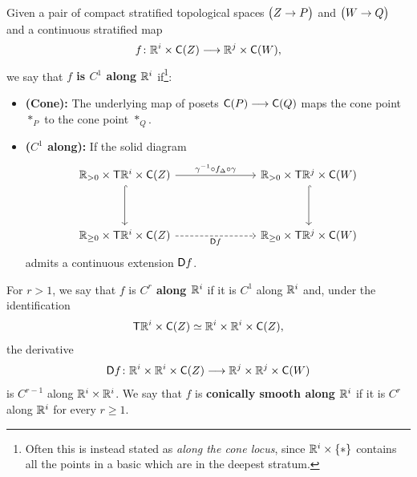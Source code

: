 \begin{definition}\cite[Definition 3.1.4]{AFT1}
    \label{ch4:: def: conically smooth along}
    Given a pair of compact stratified topological spaces $\big(Z\rightarrow P\big)$ and $\big(W\rightarrow Q\big)$ and a continuous stratified map 
    \begin{equation}
        f \colon \mathbb R^{i} \times \mathsf C(Z) \longrightarrow \mathbb R^{j} \times \mathsf C(W),
    \end{equation} 
    we say that \textbf{$f$ is $C^1$ along $\mathbb R^{i}$} if\footnote{Often this is instead stated as \emph{along the cone locus}, since $\mathbb R^{i}\times \{*\}$ contains all the points in a basic which are in the deepest stratum.}:
    \begin{itemize}
        \item \textbf{(Cone):} The underlying map of posets $\mathsf C(P) \longrightarrow \mathsf C(Q)$ maps the cone point $*_P$ to the cone point $*_Q$.
        \item \textbf{($C^1$ along):} If the solid diagram 
        \begin{equation}
            \begin{tikzcd}
                {\RR_{>0}\times \sT\RR^{i}\times \sC(Z)} &&& {\RR_{>0}\times \sT\RR^{j}\times \sC(W)} \\
                \\
                {\RR_{\geq 0}\times \sT\RR^{i}\times \sC(Z)} &&& {\RR_{\geq 0}\times \sT\RR^{j}\times \sC(W)}
                \arrow["{\gamma^{-1}\circ f_{\Delta}\circ \gamma}", from=1-1, to=1-4]
                \arrow[hook, from=1-1, to=3-1]
                \arrow[hook, from=1-4, to=3-4]
                \arrow["{\sD f}"', dashed, from=3-1, to=3-4]
            \end{tikzcd}
        \end{equation}
        admits a continuous extension $\mathsf D f$.  
    \end{itemize}
    For $r>1$, we say that $f$ is \textbf{$C^{r}$ along $\mathbb R^{i}$} if it is $C^1$ along $\mathbb R^{i}$ and, under the identification
    \begin{equation}
        \mathsf T\mathbb R^{i}\times \mathsf C(Z) \simeq \mathbb R^{i}\times \mathbb R^{i}\times \mathsf C(Z),
    \end{equation}
    the derivative
    \begin{equation}
        \mathsf D f \colon \mathbb R^{i}\times \mathbb R^{i}\times \mathsf C(Z) \longrightarrow \mathbb R^{j}\times \mathbb R^{j}\times \mathsf C(W)
    \end{equation}
    is $C^{r-1}$ along $\mathbb R^{i}\times \mathbb R^{i}$. We say that $f$ is \textbf{conically smooth along $\mathbb R^i$} if it is $C^r$ along $\mathbb R^i$ for every $r\geq 1$.
\end{definition}

